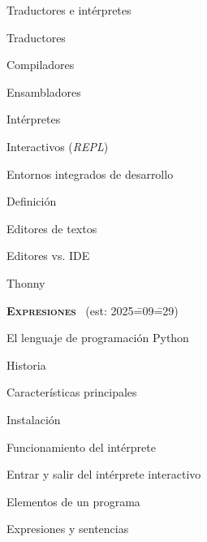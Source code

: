 \begin{longenum}
\begin{longenum}
\begin{longenum}
        \end{longenum}
        \item Traductores e intérpretes
        \begin{longenum}
            \item Traductores
            \item Compiladores
            \begin{longenum}
                \item Ensambladores
            \end{longenum}
            \item Intérpretes
            \begin{longenum}
                \item Interactivos (\textit{REPL})
            \end{longenum}
        \end{longenum}
        \item Entornos integrados de desarrollo
        \begin{longenum}
            \item Definición
            \item Editores de textos
            \item Editores vs. IDE
            \item Thonny
        \end{longenum}
    \end{longenum}
    \item \textbf{\textsc{Expresiones}} \ (est: 2025\==09\==29)
    \begin{longenum}
        \item El lenguaje de programación Python
        \begin{longenum}
            \item Historia
            \item Características principales
            \item Instalación
            \item Funcionamiento del intérprete
            \begin{longenum}
                \item Entrar y salir del intérprete interactivo
            \end{longenum}
        \end{longenum}
        \item Elementos de un programa
        \begin{longenum}
            \item Expresiones y sentencias

\end{longenum}
\end{longenum}
\end{longenum}
